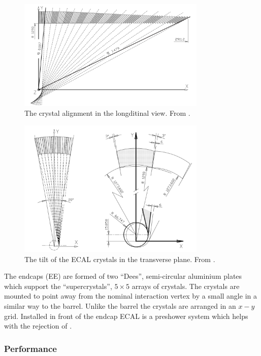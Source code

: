 \begin{figure}[htbp]
  \centering
  \includegraphics[width=0.8\textwidth]{crystallong}
  \caption{The crystal alignment in the longditinal view. From \cite{ecaltdr}. }
  \label{fig:crystallong}
\end{figure}

\begin{figure}[htbp]
  \centering
  \includegraphics[width=0.8\textwidth]{crystaltilt}
  \caption{The tilt of the ECAL crystals in the transverse plane. From \cite{ecaltdr}. }
  \label{fig:crystaltilt}
\end{figure}

The endcaps (EE) are formed of two ``Dees'', semi-circular aluminium plates
which support the ``supercrystals'', $5\times5$ arrays of crystals. The crystals are
mounted to point away from the nominal interaction vertex by a small angle in a similar way
to the barrel. 
Unlike the barrel the crystals are arranged in an $x-y$ grid.
Installed in front of the endcap ECAL is a preshower system which helps with
the rejection of \Ppizero \cite{cms}.

\subsubsection{Performance}

